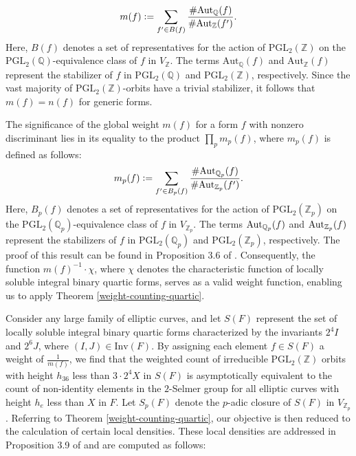 \documentclass{article}
\def\Aut{{\rm Aut}}
\begin{document}
\begin{equation*}
m(f) \vcentcolon= \sum_{f'\in B(f)}\frac{\#\text{Aut}_{\mathbb{Q}}(f)}{\#\text{Aut}_{\mathbb{Z}}(f')}.
\end{equation*}
Here, $B(f)$ denotes a set of representatives for the action of $\text{PGL}_2(\mathbb{Z})$ on the $\text{PGL}_2(\mathbb{Q})$-equivalence class of $f$ in $V_{\mathbb{Z}}$. The terms $\text{Aut}_{\mathbb{Q}}(f)$ and $\text{Aut}_{\mathbb{Z}}(f)$ represent the stabilizer of $f$ in $\text{PGL}_2(\mathbb{Q})$ and $\text{PGL}_2(\mathbb{Z})$, respectively. Since the vast majority of $\text{PGL}_2(\mathbb{Z})$-orbits have a trivial stabilizer, it follows that $m(f) = n(f)$ for generic forms.


The significance of the global weight $m(f)$ for a form $f$ with nonzero discriminant lies in its equality to the product $\prod_{p} m_p(f)$, where $m_p(f)$ is defined as follows:
\begin{equation*}
    m_p(f) \vcentcolon= \sum_{f' \in B_p(f)} \frac{\# \Aut_{\mathbb{Q}_p}(f)}{\# \Aut_{\mathbb{Z}_p}(f')}.
\end{equation*}
Here, $B_p(f)$ denotes a set of representatives for the action of $\text{PGL}_2(\mathbb{Z}_p)$ on the $\text{PGL}_2(\mathbb{Q}_p)$-equivalence class of $f$ in $V_{\mathbb{Z}_p}$. The terms $\Aut_{\mathbb{Q}_p}(f)$ and $\Aut_{\mathbb{Z}_p}(f)$ represent the stabilizers of $f$ in $\text{PGL}_2(\mathbb{Q}_p)$ and $\text{PGL}_2(\mathbb{Z}_p)$, respectively. The proof of this result can be found in Proposition 3.6 of \cite{main}. Consequently, the function $m(f)^{-1} \cdot \chi$, where $\chi$ denotes the characteristic function of locally soluble integral binary quartic forms, serves as a valid weight function, enabling us to apply Theorem \ref{weight-counting-quartic}.


Consider any large family of elliptic curves, and let $S(F)$ represent the set of locally soluble integral binary quartic forms characterized by the invariants $2^4I$ and $2^6J$, where $(I, J) \in \text{Inv}(F)$. By assigning each element $f \in S(F)$ a weight of $\frac{1}{m(f)}$, we find that the weighted count of irreducible $\text{PGL}_2(\mathbb{Z})$ orbits with height $h_{36}$ less than $3\cdot2^4X$ in $S(F)$ is asymptotically equivalent to the count of non-identity elements in the $2$-Selmer group for all elliptic curves with height $h_e$ less than $X$ in $F$. Let $S_p(F)$ denote the $p$-adic closure of $S(F)$ in $V_{\mathbb{Z}_p}$. Referring to Theorem \ref{weight-counting-quartic}, our objective is then reduced to the calculation of certain local densities. These local densities are addressed in Proposition 3.9 of \cite{main} and are computed as follows:
\end{document}

